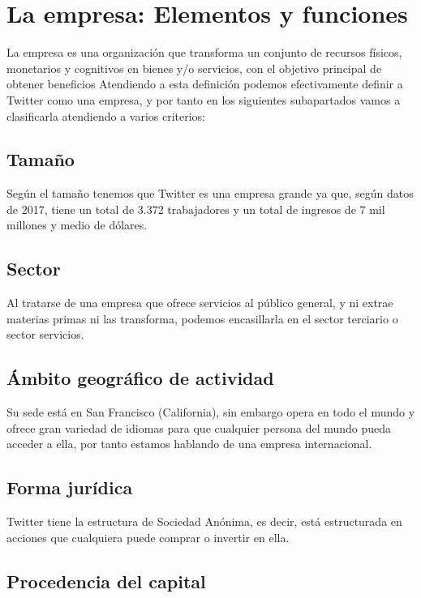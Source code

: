 \section{La empresa: Elementos y funciones}

La empresa es una organización que transforma un conjunto de recursos físicos, monetarios y cognitivos en bienes y/o servicios, con el objetivo principal de obtener beneficios \cite{}
Atendiendo a esta definición podemos efectivamente definir a Twitter como una empresa, y por tanto en los siguientes subapartados vamos a clasificarla atendiendo a varios criterios:

\subsection{Tamaño}

Según el tamaño tenemos que Twitter es una empresa grande ya que, según datos de 2017, tiene un total de 3.372 trabajadores y un total de ingresos de 7 mil millones y medio de dólares.

\subsection{Sector}

Al tratarse de una empresa que ofrece servicios al público general, y ni extrae materias primas ni las transforma, podemos encasillarla en el sector terciario o sector servicios.

\subsection{Ámbito geográfico de actividad}

Su sede está en San Francisco (California), sin embargo opera en todo el mundo y ofrece gran variedad de idiomas para que cualquier persona del mundo pueda acceder a ella, por tanto estamos hablando de una empresa internacional.

\subsection{Forma jurídica}

Twitter tiene la estructura de Sociedad Anónima, es decir, está estructurada en acciones que cualquiera puede comprar o invertir en ella.

\subsection{Procedencia del capital}

